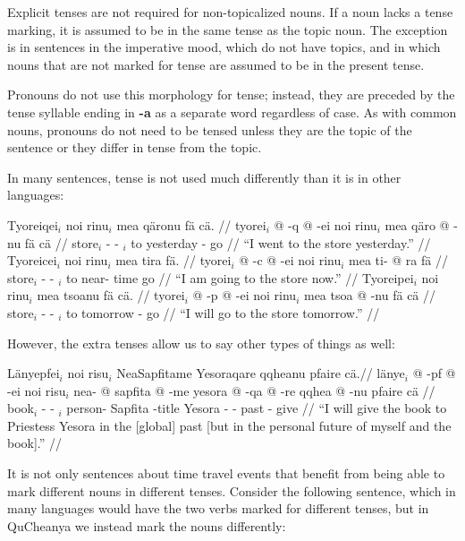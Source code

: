 \documentclass{article}
\begin{document}
Explicit tenses are not required for non-topicalized nouns.  If a noun lacks a tense marking, it is assumed to be in the same tense as the topic noun.  The exception is in sentences in the imperative mood, which do not have topics, and in which nouns that are not marked for tense are assumed to be in the present tense.

Pronouns do not use this morphology for tense; instead, they are preceded by the tense syllable ending in \textbf{-a} as a separate word regardless of case. As with common nouns, pronouns do not need to be tensed unless they are the topic of the sentence or they differ in tense from the topic.

In many sentences, tense is not used much differently than it is in other languages:

\pex[lingstyle=QuCheanya] 
\a
\begingl
\glpreamble Tyoreiqei$_i$ noi rinu$_i$ mea q\"aronu f\"a c\"a. //
\gla tyorei$_i$ @ -q @ -ei noi rinu$_i$ mea q\"aro @ -nu f\"a c\"a //
\glb store$_i$ - -  $_i$ to yesterday - go  //
\glft ``I went to the store yesterday.'' //
\endgl
\a
\begingl
\glpreamble Tyoreicei$_i$ noi rinu$_i$ mea tira f\"a. //
\gla tyorei$_i$ @ -c @ -ei noi rinu$_i$ mea ti- @ ra f\"a //
\glb store$_i$ - -  $_i$ to near- time go //
\glft ``I am going to the store now.'' //
\endgl
\a
\begingl
\glpreamble Tyoreipei$_i$ noi rinu$_i$ mea tsoanu f\"a c\"a. //
\gla tyorei$_i$ @ -p @ -ei noi rinu$_i$ mea tsoa @ -nu f\"a c\"a //
\glb store$_i$ - -  $_i$ to tomorrow - go  //
\glft ``I will go to the store tomorrow.'' //
\endgl
\xe

However, the extra tenses allow us to say other types of things as well:

\ex[lingstyle=QuCheanya] \begingl
\glpreamble L\"anyepfei$_i$ noi risu$_i$ NeaSapfitame Yesoraqare qqheanu pfaire c\"a.//
\gla l\"anye$_i$ @ -pf @ -ei noi risu$_i$ nea- @ sapfita @ -me yesora @ -qa @ -re qqhea @ -nu pfaire c\"a //
\glb book$_i$ - -  $_i$ person- Sapfita -title Yesora - - past - give  //
\glft ``I will give the book to Priestess Yesora in the [global] past [but in the personal future of myself and the book].'' //
\endgl \xe

It is not only sentences about time travel events that benefit from being able to mark different nouns in different tenses. Consider the following sentence, which in many languages would have the two verbs marked for different tenses, but in QuCheanya we instead mark the nouns differently:
\end{document}
